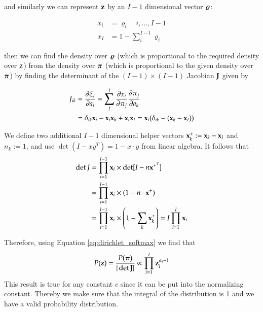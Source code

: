 and similarly we can represent $\mathbf{z}$ by an $I-1$ dimensional vector ${\boldsymbol{\varrho}}$:

\begin{align}
    x_i &= \varrho_i \quad i,...,I-1 \\
    x_I &= 1 - \sum_i^{I-1}\varrho_i
\end{align}

then we can find the density over ${\boldsymbol{\varrho}}$ (which is proportional to the required density over ${\textnormal{z}}$)
from the density over $\boldsymbol{\pi}$ (which is proportional to the given density over $\boldsymbol{\pi}$) by finding the
determinant of the $(I - 1) \times (I - 1)$ Jacobian ${\mathbf{J}}$ given by

\begin{align}
    J_{ik} &= \frac{\partial \xi_i}{\partial a_i} = \sum_j^{I} \frac{\partial x_i}{\partial \pi_j}\frac{\partial \pi_j}{\partial a_k} \nonumber\\
    &= \delta_{ik}{\mathbf{x}}_i - {\mathbf{x}}_i{\mathbf{x}}_k + {\mathbf{x}}_i{\mathbf{x}}_I =  {\mathbf{x}}_i(\delta_{ik} - ({\mathbf{x}}_k - {\mathbf{x}}_I))
\end{align}

We define two additional $I-1$ dimensional helper vectors ${\mathbf{x}}_k^+ := {\mathbf{x}}_k - {\mathbf{x}}_I$ and $n_k := 1$, and use $\det(I - xy^T) = 1 - x \cdot y$ from linear algebra. It follows that
\begin{align}
    \det J &= \prod_{i=1}^{I-1} {\mathbf{x}}_i \times \det[I-n{\mathbf{x}}^{+^T}] \nonumber \\
    &= \prod_{i=1}^{I-1} {\mathbf{x}}_i \times (1 - n \cdot {\mathbf{x}}^{+})  \\
    &= \prod_{i=1}^{I-1} {\mathbf{x}}_i \times \left(1 - \sum_k {\mathbf{x}}_k^{+} \right) = I \prod_{i=1}^I {\mathbf{x}}_i \nonumber
\end{align}

Therefore, using Equation \ref{eq:dirichlet_softmax} we find that
\begin{equation}
    P(\mathbf{z}) = \frac{P(\boldsymbol{\pi})}{|\det {\mathbf{J}}|} \propto \prod_{i=1}^{I} \mathbf{z}_i^{\alpha_i - 1} 
\end{equation}
This result is true for any constant $c$ since it can be put into the normalizing constant. Thereby we make sure that the integral of the distribution is 1 and we have a valid probability distribution.